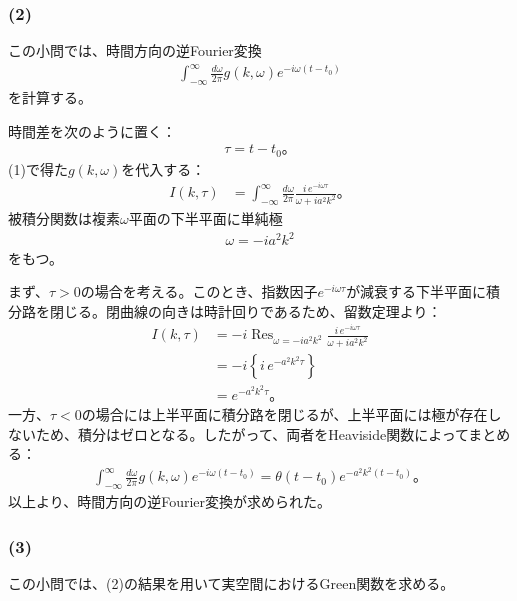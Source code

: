 \documentclass[platex,dvipdfmx,a4paper]{jsarticle}
\begin{document}
  \subsubsection*{(2)}

  この小問では、時間方向の逆Fourier変換
  \begin{align*}
    \int_{-\infty}^{\infty}\frac{d\omega}{2\pi}
    g(k,\omega)e^{-i\omega(t-t_0)}
  \end{align*}
  を計算する。

  時間差を次のように置く：
  \begin{align*}
    \tau=t-t_0。
  \end{align*}
  (1)で得た$g(k,\omega)$を代入する：
  \begin{align*}
    I(k,\tau)
    &=\int_{-\infty}^{\infty}\frac{d\omega}{2\pi}
    \frac{i\,e^{-i\omega\tau}}{\omega+ia^2k^2}。
  \end{align*}
  被積分関数は複素$\omega$平面の下半平面に単純極
  \begin{align*}
    \omega=-ia^2k^2
  \end{align*}
  をもつ。

  まず、$\tau>0$の場合を考える。このとき、指数因子$e^{-i\omega\tau}$が減衰する下半平面に積分路を閉じる。閉曲線の向きは時計回りであるため、留数定理より：
  \begin{align*}
    I(k,\tau)
    &=-i\mathop{\mathrm{Res}}_{\omega=-ia^2k^2}
    \frac{i\,e^{-i\omega\tau}}{\omega+ia^2k^2}\\
    &=-i\left\{i\,e^{-a^2k^2\tau}\right\}\\
    &=e^{-a^2k^2\tau}。
  \end{align*}
  一方、$\tau<0$の場合には上半平面に積分路を閉じるが、上半平面には極が存在しないため、積分はゼロとなる。したがって、両者をHeaviside関数によってまとめる：
  \begin{align*}
    \int_{-\infty}^{\infty}\frac{d\omega}{2\pi}
    g(k,\omega)e^{-i\omega(t-t_0)}
    =
    \theta(t-t_0)e^{-a^2k^2(t-t_0)}。
  \end{align*}
  以上より、時間方向の逆Fourier変換が求められた。

  \subsubsection*{(3)}

  この小問では、(2)の結果を用いて実空間におけるGreen関数を求める。
\end{document}
